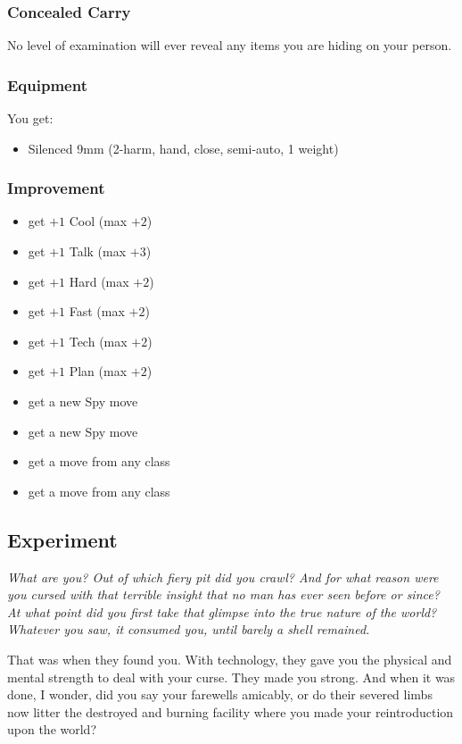 \subsubsection{Concealed Carry}
No level of examination will ever reveal any items you are hiding on your person.


\subsubsection{Equipment}
You get:
\begin{itemize}
\item Silenced 9mm (2-harm, hand, close, semi-auto, 1 weight)
\end{itemize}

\subsubsection{Improvement}
\begin{itemize}
\item get $+1$ Cool (max $+2$)
\item get $+1$ Talk (max $+3$)
\item get $+1$ Hard (max $+2$)
\item get $+1$ Fast (max $+2$)
\item get $+1$ Tech (max $+2$)
\item get $+1$ Plan (max $+2$)
\item get a new Spy move
\item get a new Spy move
\item get a move from any class
\item get a move from any class
\end{itemize}


\subsection{Experiment}
{\itshape What \emph{are} you? Out of which fiery pit did you crawl?
  And for what reason were you cursed with that terrible insight that
  no man has ever seen before or since? At what point did you first
  take that glimpse into the true nature of the world?  Whatever you
  saw, it consumed you, until barely a shell remained.

That was when they found you. With technology, they gave you the
physical and mental strength to deal with your curse. They made you
strong. And when it was done, I wonder, did you say your farewells
amicably, or do their severed limbs now litter the destroyed and
burning facility where you made your reintroduction upon the world?}

